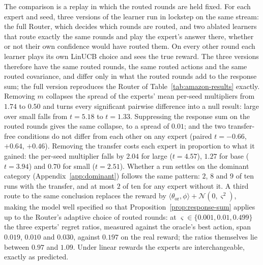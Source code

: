 \documentclass[anon]{alt2027} %
\begin{document}
The comparison is a replay in which the routed rounds are held fixed. For
each expert and seed, three versions of the learner run in lockstep on the
same stream: the full Router, which decides which rounds are routed, and two
ablated learners that route exactly the same rounds and play the expert's
answer there, whether or not their own confidence would have routed them. On
every other round each learner plays its own LinUCB choice and sees the true
reward. The three versions therefore have the same routed rounds, the same
routed actions and the same routed covariance, and differ only in what the
routed rounds add to the response sum; the full version reproduces the
Router of Table~\ref{tab:amazon-results} exactly. Removing $m$ collapses the
spread of the experts' mean per-seed multipliers from $1.74$ to $0.50$ and
turns every significant pairwise difference into a null result: large over
small falls from $t=5.18$ to $t=1.33$. Suppressing the response sum on the
routed rounds gives the same collapse, to a spread of $0.01$; and the two
transfer-free conditions do not differ from each other on any expert (paired
$t=-0.66$, $+0.64$, $+0.46$). Removing the transfer costs each expert in
proportion to what it gained: the per-seed multiplier falls by $2.04$ for
large ($t=4.57$), $1.27$ for base ($t=3.94$) and $0.70$ for small
($t=2.51$). Whether a run settles on the dominant category
(Appendix~\ref{app:dominant}) follows the same pattern: $2$, $8$ and $9$ of
ten runs with the transfer, and at most $2$ of ten for any expert without
it. A third route to the same conclusion
replaces the reward by $\langle\theta_{\mathrm{or}},\phi\rangle+\mathcal
N(0,\varsigma^2)$, making the model well specified so that
Proposition~\ref{prop:response-sum} applies up to the Router's adaptive
choice of routed rounds: at
$\varsigma\in\{0.001,0.01,0.499\}$ the three experts' regret ratios, measured
against the oracle's best action, span $0.019$, $0.010$ and $0.030$, against
$0.197$ on the real reward; the ratios themselves lie between $0.97$ and
$1.09$. Under linear rewards the experts are interchangeable, exactly as
predicted.
\end{document}
